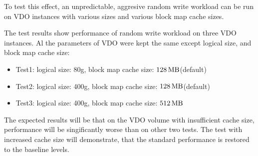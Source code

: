\documentclass[
  color, %
  table, %
  lof,   %
  lot,   %
]{fithesis3}
\begin{document}
To test this effect, an unpredictable, aggresive random write workload can be run on VDO instances with various sizes and various block map cache sizes.

The test results show performance of random write workload on three VDO instances. Al the parameters of VDO were kept the same except logical size, and block map cache size:






\begin{itemize}
    \item Test1: logical size: 80g, block map cache size: $\SI{128}{\mega\byte}$(default)
    \item Test2: logical size: 400g, block map cache size: $\SI{128}{\mega\byte}$(default)
    \item Test3: logical size: 400g, block map cache size: $\SI{512}{\mega\byte}$ 
\end{itemize}

The expected results will be that on the VDO volume with insufficient cache size, performance will be singificantly worse than on other two tests. The test with increased cache size will demonstrate, that the standard performance is restored to the baseline levels.
\end{document}
